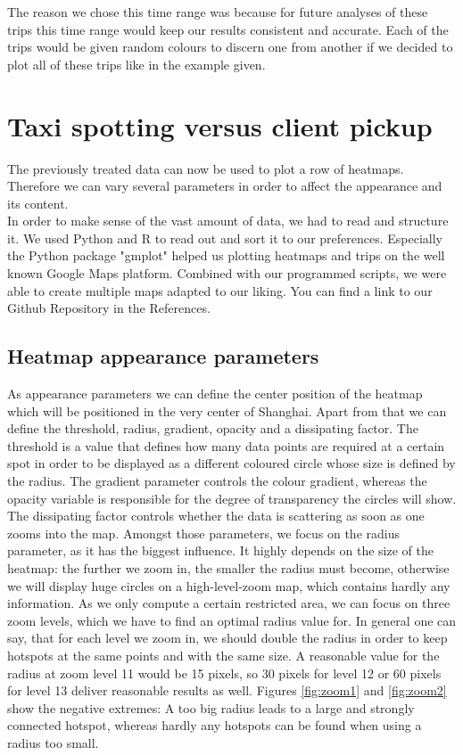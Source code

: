 \documentclass[11pt,conference,a4paper,twocolumns,romanappendices]{IEEEtran}
\begin{document}
The reason we chose this time range was because for future analyses of these trips this time range would keep our results consistent and accurate. Each of the trips would be given random colours to discern one from another if we decided to plot all of these trips like in the example given. \\

\section{Taxi spotting versus client pickup}
The previously treated data can now be used to plot a row of heatmaps. Therefore we can vary several parameters in order to affect the appearance and its content.\\
In order to make sense of the vast amount of data, we had to read and structure it. We used Python and R to read out and sort it to our preferences. Especially the Python package "gmplot" \cite{gmplot} helped us plotting heatmaps and trips on the well known Google Maps platform. Combined with our programmed scripts, we were able to create multiple maps adapted to our liking. You can find a link to our Github Repository in the References. \cite{github-IoTTrace} \\
\subsection{Heatmap appearance parameters}
As appearance parameters we can define the center position of the heatmap which will be positioned in the very center of Shanghai. Apart from that we can define the threshold, radius, gradient, opacity and a dissipating factor. The threshold is a value that defines how many data points are required at a certain spot in order to be displayed as a different coloured circle whose size is defined by the radius. The gradient parameter controls the colour gradient, whereas the opacity variable is responsible for the degree of transparency the circles will show. The dissipating factor controls whether the data is scattering as soon as one zooms into the map.
Amongst those parameters, we focus on the radius parameter, as it has the biggest influence. It highly depends on the size of the heatmap: the further we zoom in, the smaller the radius must become, otherwise we will display huge circles on a high-level-zoom map, which contains hardly any information. As we only compute a certain restricted area, we can focus on three zoom levels, which we have to find an optimal radius value for. In general one can say, that for each level we zoom in, we should double the radius in order to keep hotspots at the same points and with the same size. A reasonable value for the radius at zoom level 11 would be 15 pixels, so 30 pixels for level 12 or 60 pixels for level 13 deliver reasonable results as well. Figures \ref{fig:zoom1} and \ref{fig:zoom2} show the negative extremes: A too big radius leads to a large and strongly connected hotspot, whereas hardly any hotspots can be found when using a radius too small.
\end{document}
